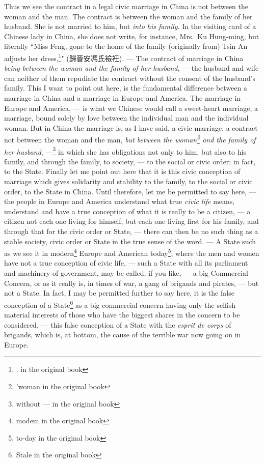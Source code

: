 Thus we see the contract in a legal civic marriage in China is not between the woman and the man.
The contract is between the woman and the family of her husband.
She is not married to him, but \emph{into his family}.
In the visiting card of a Chinese lady in China, she does not write, for instance, Mrs.~Ku Hung-ming, but literally ``Miss Feng, gone to the home of the family (originally from) Tsin An adjusts her dress,\footnote{. in the original book}" (歸晉安馮氏襝衽).
--- The contract of marriage in China \emph{being between the woman and the family of her husband}, --- the husband and wife can neither of them repudiate the contract without the consent of the husband's family.
This I want to point out here, is the fundamental difference between a marriage in China and a marriage in Europe and America.
The marriage in Europe and America, --- is what we Chinese would call a sweet-heart marriage, a marriage, bound solely by love between the individual man and the individual woman.
But in China the marriage is, as I have said, a civic marriage, a contract not between the woman and the man, \emph{but between the woman\footnote{'woman in the original book} and the family of her husband}, ---\footnote{without --- in the original book} in which she has obligations not only to him, but also to his family, and through the family, to society, --- to the social or civic order; in fact, to the State.
Finally let me point out here that it is this civic conception of marriage which gives solidarity and stability to the family, to the social or civic order, to the State in China. 
Until therefore, let me be permitted to say here, --- the people in Europe and America understand what true \emph{civic life} means, understand and have a true conception of what it is really to be a citizen, --- a citizen not each one living for himself, but each one living first for his family, and through that for the civic order or State, --- there can then be no such thing as a stable society, civic order or State in the true sense of the word.
--- A State such as we see it in modern\footnote{modem in the original book} Europe and American today\footnote{to-day in the original book}, where the men and women have not a true conception of civic life, --- such a State with all its parliament and machinery of government, may be called, if you like, --- a big Commercial Concern, or as it really is, in times of war, a gang of brigands and pirates, --- but not a State.
In fact, I may be permitted further to say here, it is the false conception of a State\footnote{Stale in the original book} as a big commercial concern having only the selfish material interests of those who have the biggest shares in the concern to be considered, --- this false conception of a State with the \emph{esprit de corps}  of brigands, which is, at bottom, the cause of the terrible war now going on in Europe.
